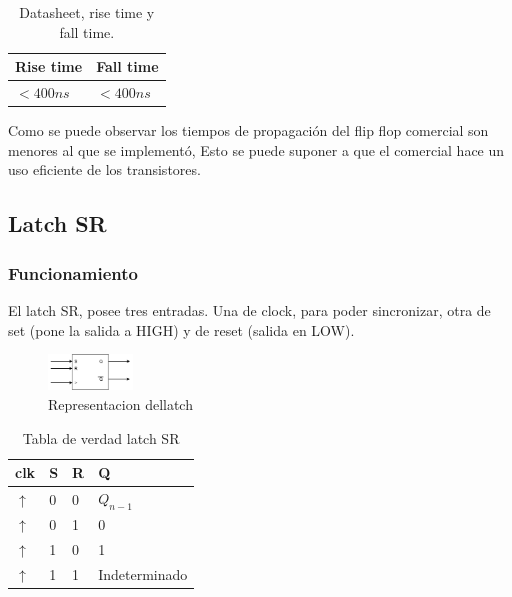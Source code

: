 \documentclass[../../e3_tp2_main.tex]{subfiles}
\begin{document}
\begin{table}[H]
\begin{center}
\begin{tabular}{|l|l|}
\hline
Rise time& Fall time \\
\hline \hline
$<400 n s$  & $<400 n s$ \\ \hline
\end{tabular}
\caption{Datasheet, rise time y fall time.} 
\end{center}
\end{table}

Como se puede observar los tiempos de propagación del flip flop comercial son menores al que se implementó, Esto se puede suponer a que el comercial hace un uso eficiente de los transistores.

\subsection{Latch SR}

\subsubsection{Funcionamiento}
El latch SR, posee tres entradas. Una de clock, para poder sincronizar, otra de set (pone la salida a HIGH) y de reset (salida en LOW).
\begin{figure}[H]	
	\centering
	\includegraphics[width=0.2\textwidth]{imagenes/lsr_b.png}
	\caption{Representacion dellatch}
\end{figure}

\begin{table}[h]
\begin{center}
\begin{tabular}{|l|l|l|l|}
\hline
clk&S & R & Q\\
\hline \hline
$\uparrow$ & 0 & 0 & $Q_{n-1}$ \\ \hline
$\uparrow$ & 0 & 1 &0 \\ \hline
$\uparrow$ & 1 & 0 & 1 \\ \hline
$\uparrow$ & 1 &1 & Indeterminado \\ \hline

\end{tabular}
\caption{Tabla de verdad latch  SR} 
\end{center}
\end{table}
\end{document}
